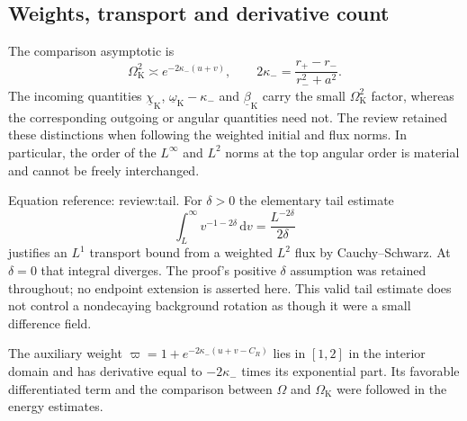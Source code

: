 \documentclass[10pt]{article}
\begin{document}
\subsection*{Weights, transport and derivative count}
The comparison asymptotic is \[\Omega_{\mathrm K}^2\asymp e^{-2\kappa_-(u+v)},\qquad
 2\kappa_-=\frac{r_+-r_-}{r_-^2+a^2}.\] The incoming quantities \(\underline\chi_{\mathrm K}\), \(\underline\omega_{\mathrm K}-\kappa_-\) and \(\underline\beta_{\mathrm K}\) carry the small \(\Omega_{\mathrm K}^2\) factor, whereas the corresponding outgoing or angular quantities need not. The review retained these distinctions when following the weighted initial and flux norms. In particular, the order of the \(L^\infty\) and \(L^2\) norms at the top angular order is material and cannot be freely interchanged.\par
Equation reference: review:tail. For \(\delta>0\) the elementary tail estimate \[
 \int_L^\infty v^{-1-2\delta}\,\mathrm dv
      =\frac{L^{-2\delta}}{2\delta}\] justifies an \(L^1\) transport bound from a weighted \(L^2\) flux by Cauchy–Schwarz. At \(\delta=0\) that integral diverges. The proof’s positive \(\delta\) assumption was retained throughout; no endpoint extension is asserted here. This valid tail estimate does not control a nondecaying background rotation as though it were a small difference field.\par
The auxiliary weight \(\varpi=1+e^{-2\kappa_-(u+v-C_R)}\) lies in \([1,2]\) in the interior domain and has derivative equal to \(-2\kappa_-\) times its exponential part. Its favorable differentiated term and the comparison between \(\Omega\) and \(\Omega_{\mathrm K}\) were followed in the energy estimates.\par
\end{document}
